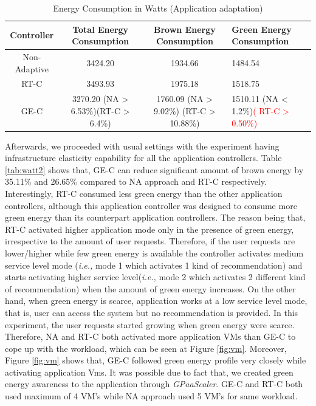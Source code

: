
\begin{table}
\caption{Energy Consumption in Watts (Application adaptation)}
  \label{tab:watt1}
\begin{tabular}{cccl}
\toprule
Controller & Total Energy Consumption & Brown Energy Consumption & Green Energy Consumption\\
\midrule
Non-Adaptive & 3424.20 & 1934.66 & 1484.54 \\
RT-C & 3493.93 & 1975.18 & 1518.75  \\  %
GE-C & 3270.20 (NA > 6.53\%)(RT-C > 6.4\%) & 1760.09 (NA > 9.02\%) (RT-C > 10.88\%) & 1510.11 (NA < 1.2\%)\textcolor{red}{( RT-C > 0.50\%)} \\
\bottomrule
\end{tabular}
\end{table}


Afterwards, we proceeded with usual settings with the experiment having infrastructure elasticity capability for all the application controllers. Table \ref{tab:watt2} shows that, GE-C can reduce significant amount of brown energy by 35.11\% and 26.65\% compared to NA approach and RT-C respectively. Interestingly, RT-C consumed less green energy than the other application controllers, although this application controller was designed to consume more green energy than its counterpart application controllers. The reason being that, RT-C activated higher application mode  only in the presence of green energy, irrespective to the amount of user requests. Therefore, if the user requests are lower/higher while few green energy is available the controller activates medium service level mode (\emph{i.e.,} mode 1 which activates 1 kind of recommendation) and starts activating higher service level(\emph{i.e.,} mode 2 which activates 2 different kind of recommendation) when the amount of green energy increases. On the other hand, when green energy is scarce, application works at a low service level mode, that is, user can access the system but no recommendation is provided. In this experiment, the user requests started growing when green energy were scarce. Therefore, NA and RT-C both activated more application VMs than GE-C to cope up with the workload, which can be seen at Figure \ref{fig:vm}. Moreover, Figure \ref{fig:vm} shows that, GE-C followed green energy profile very closely while activating application Vms. It was possible due to fact that, we created green energy awareness to the application through \emph{GPaaScaler}. GE-C and RT-C both used maximum of 4 VM's while NA approach used 5 VM's for same workload.



